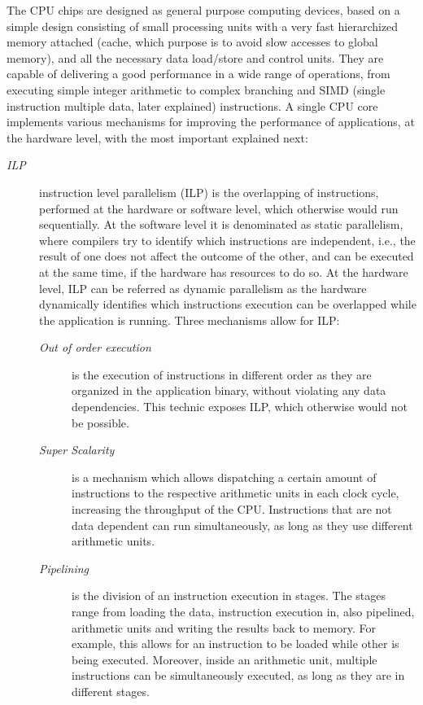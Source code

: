The CPU chips are designed as general purpose computing devices, based on a simple design consisting of small processing units with a very fast hierarchized memory attached (cache, which purpose is to avoid slow accesses to global memory), and all the necessary data load/store and control units. They are capable of delivering a good performance in a wide range of operations, from executing simple integer arithmetic to complex branching and SIMD (single instruction multiple data, later explained) instructions. A single CPU core implements various mechanisms for improving the performance of applications, at the hardware level, with the most important explained next:

\begin{description}
	\item[\textit{ILP}] instruction level parallelism (ILP) is the overlapping of instructions, performed at the hardware or software level, which otherwise would run sequentially. At the software level it is denominated as static parallelism, where compilers try to identify which instructions are independent, i.e., the result of one does not affect the outcome of the other, and can be executed at the same time, if the hardware has resources to do so. At the hardware level, ILP can be referred as dynamic parallelism as the hardware dynamically identifies which instructions execution can be overlapped while the application is running. Three mechanisms allow for ILP:
	\begin{description}
		\item[\textit{Out of order execution}] is the execution of instructions in different order as they are organized in the application binary, without violating any data dependencies. This technic exposes ILP, which otherwise would not be possible.
		\item[\textit{Super Scalarity}] is a mechanism which allows dispatching a certain amount of instructions to the respective arithmetic units in each clock cycle, increasing the throughput of the CPU. Instructions that are not data dependent can run simultaneously, as long as they use different arithmetic units.
		\item[\textit{Pipelining}] is the division of an instruction execution in stages. The stages range from loading the data, instruction execution in, also pipelined, arithmetic units and writing the results back to memory. For example, this allows for an instruction to be loaded while other is being executed. Moreover, inside an arithmetic unit, multiple instructions can be simultaneously executed, as long as they are in different stages.

\end{description}
\end{description}
